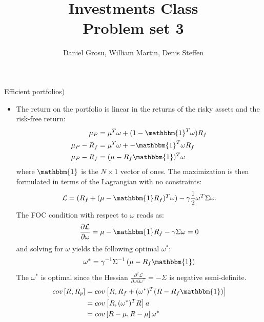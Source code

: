 \documentclass[10pt]{article}
\newcommand{\Lcal}{\mathcal{L}}
\newenvironment{exercise}[2][Exercise]{\begin{trivlist}
  \item[\hskip \labelsep {\bfseries #1}\hskip \labelsep {\bfseries #2.}]}{\end{trivlist}}
\begin{document}
	
  
  \renewcommand{\qedsymbol}{\blacksquare}
	\title{Investments Class \\ Problem set 3}
	\author{Daniel Grosu, William Martin, Denis Steffen}
	
	\maketitle

  \begin{exercise}{1}(Efficient portfolios)
    \begin{itemize}
      \item
    The return on the portfolio is linear in the returns of the risky assets and
    the risk-free return:
    \begin{align*}
      \mu_P &= \mu^T \omega + (1 - \mathbbm{1}^T \omega) R_f \\
      \mu_P - R_f &= \mu^T \omega +  - \mathbbm{1}^T \omega R_f \\
      \mu_P - R_f &= (\mu - R_f\mathbbm{1})^T \omega
    \end{align*}
    where $\mathbbm{1}$ is the $N \times 1$ vector of ones. The maximization is
    then formulated in terms of the Lagrangian with no constraints:
    \begin{align*}
      \Lcal = (R_f + (\mu - \mathbbm{1}R_f)^T \omega) - \gamma \frac 1 2 \omega^T \Sigma \omega.
    \end{align*}
    The FOC condition with respect to $\omega$ reads as:
    \begin{align*}
      \frac{\partial \Lcal}{\partial \omega} = \mu - \mathbbm{1} R_f - \gamma \Sigma \omega = 0
    \end{align*}
    and solving for $\omega$ yields the following optimal $\omega^*$:
    \begin{align*}
      \omega^* = \gamma^{-1}\Sigma^{-1} \left( \mu - R_f \mathbbm{1} \right)
    \end{align*}
    The $\omega^*$ is optimal since the Hessian $\frac{\partial^2
      \Lcal}{\partial \omega\partial \omega^\top} = -\Sigma$ is negative semi-definite.
      \begin{align*}
        cov \left[R, R_p \right] &= cov \left[ R, R_f + (\omega^*)^T(R - R_f\mathbbm{1}) \right] \\
        &= cov \left[ R, (\omega^*)^T R \right]a \\
        &= cov \left[ R - \mu, R - \mu \right] \omega^* \\

\end{align*}
\end{itemize}
\end{exercise}
\end{document}
